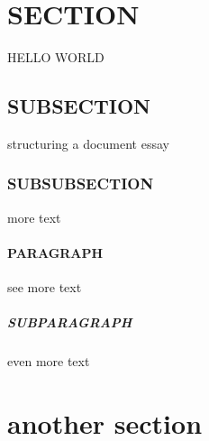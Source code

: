 \documentclass{article}
\begin{document}
	\section{SECTION}
	HELLO WORLD
	\subsection{SUBSECTION}
	structuring a document essay
	\subsubsection{SUBSUBSECTION}
	more text
	\paragraph{PARAGRAPH}
	see more text
	\subparagraph{SUBPARAGRAPH}
	even more text
	\section{another section}
\end{document}
